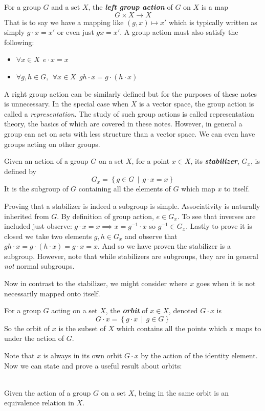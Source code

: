 \documentclass[9 pt]{report}
\begin{document}
\begin{tcolorbox}
	For a group $G$ and a set $X$, the \textbf{\emph{left group action}} of $G$ on $X$ is a map
	$$ G\times X \to X $$
	That is to say we have a mapping like $(g, x)\mapsto x'$ which is typically written as simply $ g\cdot x = x' $ or even just $gx=x'$. A group action must also satisfy the following:
	\begin{itemize}
		\item $\forall x\in X \:\: e \cdot x = x$
		\item $\forall g,h\in G , \:\:\forall x\in X \:\: gh \cdot x= g \cdot (h\cdot x)$
	\end{itemize}
	
\end{tcolorbox}
A right group action can be similarly defined but for the purposes of these notes is unnecessary. In the special case when $X$ is a vector space, the group action is called a \emph{representation}. The study of such group actions is called representation theory, the basics of which are covered in these notes. However, in general a group can act on sets with less structure than a vector space. We can even have groups acting on other groups. 

\begin{tcolorbox}
	Given an action of a group $G$ on a set $X$, for a point $x\in X$, its \textbf{\emph{stabilizer}}, $G_x$, is defined by
	$$ G_x = \left\{ g\in G \:\: | \:\: g\cdot x = x \right\}   $$
	It is the subgroup of $G$ containing all the elements of $G$ which map $x$ to itself.
\end{tcolorbox}
Proving that a stabilizer is indeed a subgroup is simple. Associativity is naturally inherited from $G$. By definition of group action, $e\in G_x$. To see that inverses are included just observe: $ g\cdot x = x \implies x = g^{-1} \cdot x$ so $g^{-1} \in G_x$. Lastly to prove it is closed we take two elements $g, h\in G_x$ and observe that $gh\cdot x = g\cdot(h\cdot x) = g\cdot x = x$. And so we have proven the stabilizer is a subgroup. However, note that while stabilizers are subgroups, they are in general \emph{not} normal subgroups. 

Now in contrast to the stabilizer, we might consider where $x$ goes when it is not necessarily mapped onto itself.

\begin{tcolorbox}
	For a group $G$ acting on a set $X$, the \textbf{\emph{orbit}} of $x\in X$, denoted $G\cdot x$ is
	$$ G\cdot x = \left\{ g\cdot x\:\: |\:\: g\in G  \right\} $$
	So the orbit of $x$ is the subset of $X$ which contains all the points which $x$ maps to under the action of $G$. 
\end{tcolorbox} 
Note that $x$ is always in its own orbit $G\cdot x$ by the action of the identity element. Now we can state and prove a useful result about orbits:
\\
\\
\begin{tcolorbox}
	Given the action of a group $G$ on a set $X$, being in the same orbit is an equivalence relation in $X$.
\end{tcolorbox}
\end{document}

